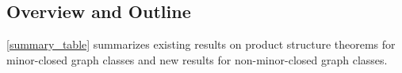 \documentclass{patmorin}
\theoremstyle{plain}
\newtheorem{thm}{Theorem}
\theoremstyle{definition}
\newcommand{\defin}[1]{\textcolor{Maroon}{\emph{#1}}}
\DeclareMathOperator{\dist}{dist}
\renewcommand{\SS}{\mathcal{S}}
\renewcommand{\geq}{\geqslant}
\renewcommand{\leq}{\leqslant}
\begin{document}




\subsection{Overview and Outline}

\cref{summary_table} summarizes existing results on product structure theorems for minor-closed graph classes and new results for non-minor-closed graph classes.
\end{document}
